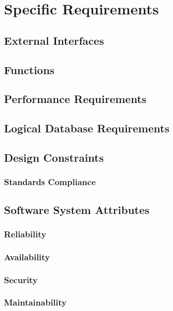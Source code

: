 \chapter{Specific Requirements}

\section{External Interfaces}

\section{Functions}

\section{Performance Requirements}

\section{Logical Database Requirements}

\section{Design Constraints}

\subsection{Standards Compliance}

\section{Software System Attributes}

\subsection{Reliability}

\subsection{Availability}

\subsection{Security}

\subsection{Maintainability}

